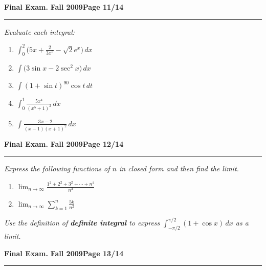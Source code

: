 \documentclass[12pt]{article}
\begin{document}
{%
\hfill{\large\bf Final Exam.}\hfill{\large\bf
  Fall 2009}\hfill{\large\bf Page 11/14}\hrule

\bigskip
{\problem[25 pts] \em  Evaluate each integral:} 
\begin{enumerate}
\item $\displaystyle{\int_0^2 \big( 5x + \frac{2}{3x^5} - \sqrt{2} e^x \big)\, dx}$
\vspace{2.5cm}
\item $\displaystyle{\int \big( 3\sin x - 2\sec^2 x \big)\, dx}$
\vspace{2.5cm}
\item $\displaystyle{\int ( 1 + \sin t)^{90} \cos t\, dt}$
\vspace{2.5cm}
\item $\displaystyle{\int_0^1 \frac{5x^4}{(x^5+1)^2}\, dx}$
\vspace{2.5cm}
\item $\displaystyle{\int \frac{3x-2}{(x-1)(x+1)^2}\, dx}$
\end{enumerate}
\newpage

\hfill{\large\bf Final Exam.}\hfill{\large\bf
  Fall 2009}\hfill{\large\bf Page 12/14}\hrule

\bigskip
{\problem[20 pts] \em Express the following functions of $n$ in closed
  form and then find the limit.}
\begin{enumerate}
\item  $\displaystyle{\lim_{n \to \infty} \frac{1^2+2^2+3^2+ \dotsb +
      n^2}{n^3}}$
\vspace{5cm}
\item  $\displaystyle{\lim_{n \to \infty} \sum_{k=1}^n \frac{5k}{n^2}}$
\vspace{5cm}
\end{enumerate}
{\problem[10 pts] \em Use the definition of \textbf{definite integral} to
  express $\int_{-\pi/2}^{\pi/2} (1+ \cos x)\, dx$ as a limit.}
\newpage

\hfill{\large\bf Final Exam.}\hfill{\large\bf
  Fall 2009}\hfill{\large\bf Page 13/14}\hrule

}
\end{document}
